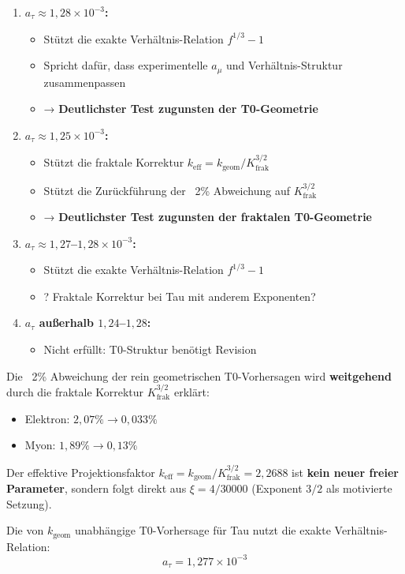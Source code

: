 	\begin{enumerate}
		\item \textbf{$a_\tau \approx 1{,}28 \times 10^{-3}$:}
		\begin{itemize}
			\item Stützt die exakte Verhältnis-Relation $f^{1/3} - 1$
			\item Spricht dafür, dass experimentelle $a_\mu$ und Verhältnis-Struktur zusammenpassen
			\item → \textbf{Deutlichster Test zugunsten der T0-Geometrie}
		\end{itemize}
		
		\item \textbf{$a_\tau \approx 1{,}25 \times 10^{-3}$:}
		\begin{itemize}
			\item Stützt die fraktale Korrektur $k_{\text{eff}} = k_\text{geom}/K_\text{frak}^{3/2}$
			\item Stützt die Zurückführung der ~2\% Abweichung auf $K_\text{frak}^{3/2}$
			\item → \textbf{Deutlichster Test zugunsten der fraktalen T0-Geometrie}
		\end{itemize}
		
		\item \textbf{$a_\tau \approx 1{,}27$--$1{,}28 \times 10^{-3}$:}
		\begin{itemize}
			\item Stützt die exakte Verhältnis-Relation $f^{1/3} - 1$
			\item ? Fraktale Korrektur bei Tau mit anderem Exponenten?
		\end{itemize}
		
		\item \textbf{$a_\tau$ außerhalb $1{,}24$--$1{,}28$:}
		\begin{itemize}
			\item Nicht erfüllt: T0-Struktur benötigt Revision
		\end{itemize}
	\end{enumerate}
	
	\begin{keypoint}[Kernaussage]
		Die ~2\% Abweichung der rein geometrischen T0-Vorhersagen wird \textbf{weitgehend} durch die fraktale Korrektur $K_\text{frak}^{3/2}$ erklärt:
		\begin{itemize}
			\item Elektron: $2{,}07\% \to 0{,}033\%$
			\item Myon: $1{,}89\% \to 0{,}13\%$
		\end{itemize}
		
		Der effektive Projektionsfaktor $k_\text{eff} = k_\text{geom}/K_\text{frak}^{3/2} = 2{,}2688$ ist \textbf{kein neuer freier Parameter}, sondern folgt direkt aus $\xi = 4/30000$ (Exponent $3/2$ als motivierte Setzung).
		
		Die von $k_{\text{geom}}$ unabhängige T0-Vorhersage für Tau nutzt die exakte Verhältnis-Relation:
		\begin{equation}
			\boxed{a_\tau = 1{,}277 \times 10^{-3}}
		\end{equation}
	\end{keypoint}	
